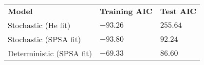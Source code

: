\begin{tabular}{|l|l|l|}
\hline
{\bf Model} & {\bf Training AIC} & {\bf Test AIC} \\ \thickhline
Stochastic (He fit) & $-93.26$ & $255.64$\\ \hline
Stochastic (SPSA fit) & $-93.80$ & $92.24$\\ \hline
Deterministic (SPSA fit) & $-69.33$ & $86.60$\\ \hline
\end{tabular}
